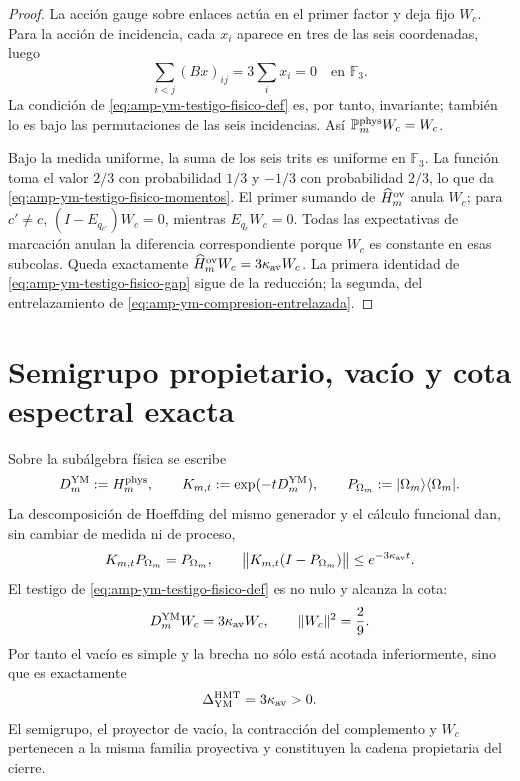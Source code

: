 \begin{proof}
La acción gauge sobre enlaces actúa en el primer factor y deja fijo
\(W_c\). Para la acción de incidencia, cada \(x_i\) aparece en tres de las
seis coordenadas, luego
\[
 \sum_{i<j}(Bx)_{ij}=3\sum_i x_i=0
 \quad\text{en }\mathbb F_3.
\]
La condición de \eqref{eq:amp-ym-testigo-fisico-def} es, por tanto,
invariante; también lo es bajo las permutaciones de las seis incidencias.
Así \(\mathbb P_m^{\rm phys}W_c=W_c\).

Bajo la medida uniforme, la suma de los seis trits es uniforme en
\(\mathbb F_3\). La función toma el valor \(2/3\) con probabilidad \(1/3\)
y \(-1/3\) con probabilidad \(2/3\), lo que da
\eqref{eq:amp-ym-testigo-fisico-momentos}. El primer sumando de
\(\widehat H_m^{\rm ov}\) anula \(W_c\); para \(c'\ne c\),
\((I-E_{q_{c'}})W_c=0\), mientras
\(E_{q_c}W_c=0\). Todas las expectativas de marcación anulan la
diferencia correspondiente porque \(W_c\) es constante en esas subcolas.
Queda exactamente
\(\widehat H_m^{\rm ov}W_c=3\kappa_{\rm av}W_c\). La primera identidad de
\eqref{eq:amp-ym-testigo-fisico-gap} sigue de la reducción; la segunda,
del entrelazamiento de \eqref{eq:amp-ym-compresion-entrelazada}.
\end{proof}

\section*{Semigrupo propietario, vacío y cota espectral exacta}

Sobre la subálgebra física se escribe
\[
 D_m^{\rm YM}:=H_m^{\rm phys},\qquad
 K_{m,t}:=\exp(-tD_m^{\rm YM}),\qquad
 P_{\Omega_m}:=|\Omega_m\rangle\langle\Omega_m|.
\]
La descomposición de Hoeffding del mismo generador y el cálculo funcional
dan, sin cambiar de medida ni de proceso,
\begin{equation}\label{eq:amp-ym-owner-semigrupo-vacio}
 K_{m,t}P_{\Omega_m}=P_{\Omega_m},
 \qquad
 \bigl\|K_{m,t}(I-P_{\Omega_m})\bigr\|
 \leq e^{-3\kappa_{\rm av}t}.
\end{equation}
El testigo de \eqref{eq:amp-ym-testigo-fisico-def} es no nulo y alcanza la
cota:
\begin{equation}\label{eq:amp-ym-owner-testigo-wc}
 D_m^{\rm YM}W_c=3\kappa_{\rm av}W_c,
 \qquad \|W_c\|^2=\frac29.
\end{equation}
Por tanto el vacío es simple y la brecha no sólo está acotada inferiormente,
sino que es exactamente
\begin{equation}\label{eq:amp-ym-owner-brecha-exacta}
 \Delta_{\rm YM}^{\rm HMT}=3\kappa_{\rm av}>0.
\end{equation}
El semigrupo, el proyector de vacío, la contracción del complemento y
\(W_c\) pertenecen a la misma familia proyectiva y constituyen la cadena
propietaria del cierre.

